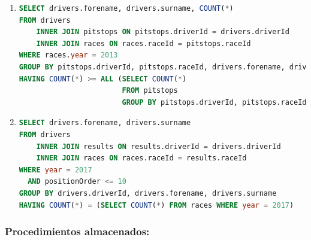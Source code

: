 \documentclass{db-practice}
\begin{document}
\begin{enumerate}
\item
\begin{lstlisting}[language=SQL]
SELECT drivers.forename, drivers.surname, COUNT(*)
FROM drivers
    INNER JOIN pitstops ON pitstops.driverId = drivers.driverId
    INNER JOIN races ON races.raceId = pitstops.raceId
WHERE races.year = 2013
GROUP BY pitstops.driverId, pitstops.raceId, drivers.forename, drivers.surname
HAVING COUNT(*) >= ALL (SELECT COUNT(*)
                        FROM pitstops
                        GROUP BY pitstops.driverId, pitstops.raceId)  
\end{lstlisting}

\item
\begin{lstlisting}[language=SQL]
SELECT drivers.forename, drivers.surname
FROM drivers 
    INNER JOIN results ON results.driverId = drivers.driverId
    INNER JOIN races ON races.raceId = results.raceId
WHERE year = 2017
  AND positionOrder <= 10
GROUP BY drivers.driverId, drivers.forename, drivers.surname
HAVING COUNT(*) = (SELECT COUNT(*) FROM races WHERE year = 2017)
\end{lstlisting}

\end{enumerate}

\subsubsection*{Procedimientos almacenados:}
\end{document}

